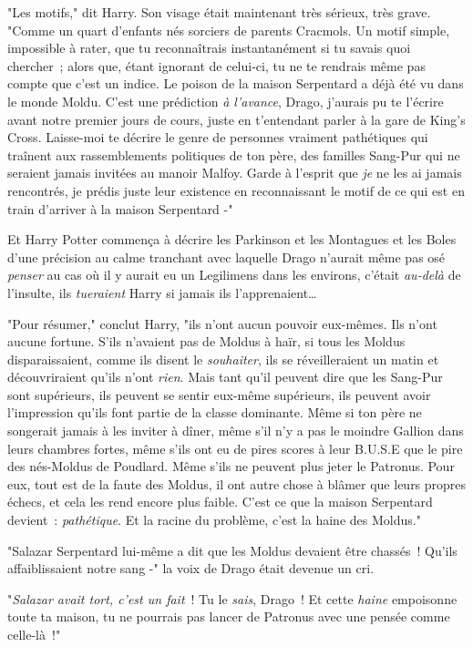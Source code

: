 "Les motifs," dit Harry. Son visage était maintenant très sérieux, très grave. "Comme un quart d'enfants nés sorciers de parents Cracmols. Un motif simple, impossible à rater, que tu reconnaîtrais instantanément si tu savais quoi chercher~; alors que, étant ignorant de celui-ci, tu ne te rendrais même pas compte que c'est un indice. Le poison de la maison Serpentard a déjà été vu dans le monde Moldu. C'est une prédiction \emph{à l'avance}, Drago, j'aurais pu te l'écrire avant notre premier jours de cours, juste en t'entendant parler à la gare de King's Cross. Laisse-moi te décrire le genre de personnes vraiment pathétiques qui traînent aux rassemblements politiques de ton père, des familles Sang-Pur qui ne seraient jamais invitées au manoir Malfoy. Garde à l'esprit que \emph{je} ne les ai jamais rencontrés, je prédis juste leur existence en reconnaissant le motif de ce qui est en train d'arriver à la maison Serpentard -"

Et Harry Potter commença à décrire les Parkinson et les Montagues et les Boles d'une précision au calme tranchant avec laquelle Drago n'aurait même pas osé \emph{penser} au cas où il y aurait eu un Legilimens dans les environs, c'était \emph{au-delà} de l'insulte, ils \emph{tueraient} Harry si jamais ils l'apprenaient…

"Pour résumer," conclut Harry, "ils n'ont aucun pouvoir eux-mêmes. Ils n'ont aucune fortune. S'ils n'avaient pas de Moldus à haïr, si tous les Moldus disparaissaient, comme ils disent le \emph{souhaiter}, ils se réveilleraient un matin et découvriraient qu'ils n'ont \emph{rien}. Mais tant qu'il peuvent dire que les Sang-Pur sont supérieurs, ils peuvent se sentir eux-même supérieurs, ils peuvent avoir l'impression qu'ils font partie de la classe dominante. Même si ton père ne songerait jamais à les inviter à dîner, même s'il n'y a pas le moindre Gallion dans leurs chambres fortes, même s'ils ont eu de pires scores à leur B.U.S.E que le pire des nés-Moldus de Poudlard. Même s'ils ne peuvent plus jeter le Patronus. Pour eux, tout est de la faute des Moldus, il ont autre chose à blâmer que leurs propres échecs, et cela les rend encore plus faible. C'est ce que la maison Serpentard devient~: \emph{pathétique}. Et la racine du problème, c'est la haine des Moldus."

"Salazar Serpentard lui-même a dit que les Moldus devaient être chassés~! Qu'ils affaiblissaient notre sang -" la voix de Drago était devenue un cri.

"\emph{Salazar avait tort, c'est un fait}~! Tu le \emph{sais}, Drago~! Et cette \emph{haine} empoisonne toute ta maison, tu ne pourrais pas lancer de Patronus avec une pensée comme celle-là~!"

